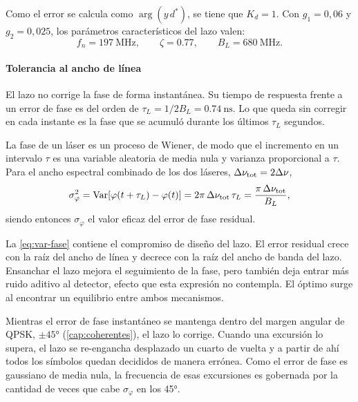 Como el error se calcula como $\arg(y\,d^{*})$, se tiene que $K_d = 1$. Con
$g_1 = 0{,}06$ y $g_2 = 0{,}025$, los parámetros característicos del lazo valen:
\begin{equation}
  f_n = \SI{197}{\mega\hertz},
  \qquad
  \zeta = \num{0.77},
  \qquad
  B_L = \SI{680}{\mega\hertz}.
  \label{eq:lazo-fase}
\end{equation}


\paragraph{Tolerancia al ancho de l\'inea}
El lazo no corrige la fase de forma instant\'anea. Su tiempo de respuesta
frente a un error de fase es del orden de
$\tau_L = 1/2B_L = \SI{0.74}{\nano\second}$. Lo que queda sin corregir en cada
instante es la fase que se acumul\'o durante los \'ultimos $\tau_L$ segundos.

La fase de un l\'aser es un proceso de Wiener, de modo que el incremento en un
intervalo $\tau$ es una variable aleatoria de media nula y varianza
proporcional a $\tau$. Para el ancho espectral combinado de los dos l\'aseres,
$\Delta\nu_{\mathrm{tot}} = 2\Delta\nu$,
\begin{equation}
  \sigma_\varphi^2
    = \operatorname{Var}\!\left[\varphi(t+\tau_L) - \varphi(t)\right]
    = 2\pi\, \Delta\nu_{\mathrm{tot}}\, \tau_L
    = \frac{\pi\, \Delta\nu_{\mathrm{tot}}}{B_L},
  \label{eq:var-fase}
\end{equation}
siendo entonces $\sigma_\varphi$ el valor eficaz del error de fase residual.

La \cref{eq:var-fase} contiene el compromiso de dise\~no del lazo. El error
residual crece con la ra\'iz del ancho de l\'inea y decrece con la ra\'iz del
ancho de banda del lazo. Ensanchar el lazo mejora el seguimiento de la fase,
pero tambi\'en deja entrar m\'as ruido aditivo al detector, efecto que esta
expresi\'on no contempla. El \'optimo surge al encontrar un equilibrio entre ambos mecanismos.

Mientras el error de fase instant\'aneo
se mantenga dentro del margen angular de QPSK, $\pm\ang{45}$
(\cref{cap:coherentes}), el lazo lo corrige. Cuando una excursi\'on lo supera,
el lazo se re-engancha desplazado un cuarto de vuelta y a partir de ah\'i
todos los s\'imbolos quedan decididos de manera err\'onea. Como el error de fase es gaussiano
de media nula, la frecuencia de esas excursiones es gobernada por la cantidad
de veces que cabe $\sigma_\varphi$ en los \ang{45}.

